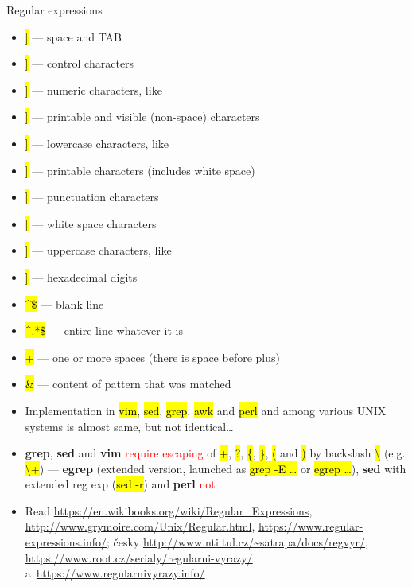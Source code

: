 \documentclass[compress, ucs, xelatex, 11pt, xcolor=svgnames,
  hyperref={
    bookmarks=true,
    unicode=true,
    colorlinks=true,
    pdftitle={Linux, command line and MetaCentrum},
    plainpages=false,
    pdfauthor={Vojtech Zeisek},
    pdfsubject={Course about use of Linux command line, writing shell scripts and using MetaCentrum of CESNET},
    pdfcreator={XeLaTeX},
    pdfkeywords={Linux, GNU, BASH, shell, command line, MetaCentrum},
    linkcolor=DarkRed,
    anchorcolor=DarkBlue,
    citecolor=Indigo,
    filecolor=NavyBlue,
    menucolor=DarkMagenta,
    urlcolor=DarkBlue,
    pdftex},
  url={hyphens, lowtilde} %
  ]{beamer}
\renewcommand{\texttt}[1]{\hl{\ttfamily #1}}
\renewcommand{\alert}[1]{\textcolor{red}{#1}}
\begin{document}
\begin{frame}[allowframebreaks]{Regular expressions}
\begin{itemize}
    \item \alert{\texttt{[[:blank:]]}} --- space and TAB
    \item \alert{\texttt{[[:cntrl:]]}} --- control characters
    \item \alert{\texttt{[[:digit:]]}} --- numeric characters, like \alert{\texttt{[0-9]}}
    \item \alert{\texttt{[[:graph:]]}} --- printable and visible (non-space) characters
    \item \alert{\texttt{[[:lower:]]}} --- lowercase characters, like \alert{\texttt{[a-z]}}
    \item \alert{\texttt{[[:print:]]}} --- printable characters (includes white space)
    \item \alert{\texttt{[[:punct:]]}} --- punctuation characters
    \item \alert{\texttt{[[:space:]]}} --- white space characters
    \item \alert{\texttt{[[:upper:]]}} --- uppercase characters, like \alert{\texttt{[A-Z]}}
    \item \alert{\texttt{[[:xdigit:]]}} --- hexadecimal digits
    \item \alert{\texttt{\textasciicircum\$}} --- blank line
    \item \alert{\texttt{\textasciicircum.*\$}} --- entire line whatever it is
    \item \alert{\texttt{ +}} --- one or more spaces (there is space before plus)
    \item \alert{\texttt{\&}} --- content of pattern that was matched
    \item Implementation in \texttt{vim}, \texttt{sed}, \texttt{grep}, \texttt{awk} and \texttt{perl} and among various UNIX systems is almost same, but not identical\ldots
    \item \textbf{grep}, \textbf{sed} and \textbf{vim} \alert{require escaping} of \alert{\texttt{+}}, \alert{\texttt{?}}, \alert{\texttt{\{}}, \alert{\texttt{\}}}, \alert{\texttt{(}} and \alert{\texttt{)}} by backslash \alert{\texttt{\textbackslash}} (e.g. \texttt{\textbackslash +}) --- \textbf{egrep} (extended version, launched as \texttt{grep -E \ldots} or \texttt{egrep \ldots}), \textbf{sed} with extended reg exp (\texttt{sed -r}) and \textbf{perl} \alert{not}
    \item Read \url{https://en.wikibooks.org/wiki/Regular_Expressions}, \url{http://www.grymoire.com/Unix/Regular.html}, \url{https://www.regular-expressions.info/}; česky \url{http://www.nti.tul.cz/~satrapa/docs/regvyr/}, \url{https://www.root.cz/serialy/regularni-vyrazy/} a~\url{https://www.regularnivyrazy.info/}

\end{itemize}
\end{frame}
\end{document}
